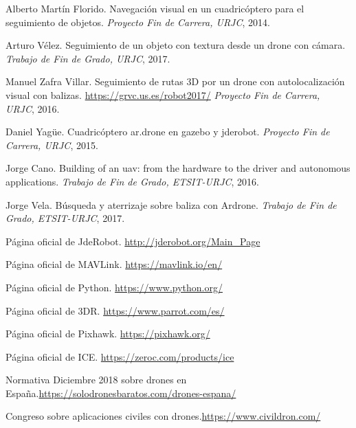 \begin{thebibliography}{1}


Alberto Martín Florido. Navegación visual en un cuadricóptero para el seguimiento de objetos. 
\textit{Proyecto Fin de Carrera, URJC}, 2014.

Arturo Vélez. Seguimiento de un objeto con textura desde un drone con cámara.
\textit{Trabajo de Fin de Grado, URJC}, 2017.

Manuel Zafra Villar. Seguimiento de rutas 3D por un drone con autolocalización visual con balizas. 
\url{https://grvc.us.es/robot2017/}
\textit{Proyecto Fin de Carrera, URJC}, 2016.

Daniel Yagüe. Cuadricóptero ar.drone en gazebo y jderobot. 
\textit{Proyecto Fin de Carrera, URJC}, 2015.

Jorge Cano. Building of an uav: from the hardware to the driver and autonomous applications. 
\textit{Trabajo de Fin de Grado, ETSIT-URJC}, 2016.

Jorge Vela. Búsqueda y aterrizaje sobre baliza con Ardrone.
\textit{Trabajo de Fin de Grado, ETSIT-URJC}, 2017.

Página oficial de JdeRobot. \url{http://jderobot.org/Main_Page}

Página oficial de MAVLink. \url{https://mavlink.io/en/}

Página oficial de Python. \url{https://www.python.org/}

Página oficial de 3DR. \url{https://www.parrot.com/es/}

Página oficial de Pixhawk. \url{https://pixhawk.org/}

Página oficial de ICE. \url{https://zeroc.com/products/ice}

Normativa Diciembre 2018 sobre drones en España.\url{https://solodronesbaratos.com/drones-espana/}

Congreso sobre aplicaciones civiles con drones.\url{https://www.civildron.com/}

\end{thebibliography}